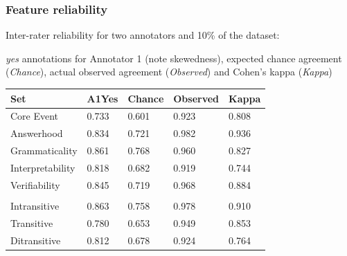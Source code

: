 \documentclass[handout,xcolor={dvipsnames}]{beamer}
\begin{document}
\begin{frame}
\frametitle{Feature reliability}
\pause
Inter-rater reliability for two annotators and 10\% of the dataset:
\pause

\textit{yes} annotations for Annotator 1 (note skewedness), expected chance agreement (\textit{Chance}), actual observed agreement (\textit{Observed}) and Cohen's kappa (\textit{Kappa})

\begin{table}[htb!]
\begin{center}
\begin{tabular}{|l|l||l|l||l|}
\hline
Set	& A1Yes & Chance & Observed & Kappa \\
\hline
\hline
Core Event & 0.733 & 0.601 & 0.923 & 0.808 \\
\hline
Answerhood & 0.834 & 0.721 & 0.982 & 0.936 \\
\hline
Grammaticality & 0.861 & 0.768 & 0.960 & 0.827 \\
\hline
Interpretability & 0.818 & 0.682 & 0.919 & 0.744 \\
\hline
Verifiability & 0.845 & 0.719 & 0.968 & 0.884 \\
\hline
\pause \\
\hline
Intransitive & 0.863 & 0.758 & 0.978 & 0.910 \\
\hline
Transitive & 0.780 & 0.653 & 0.949 & 0.853 \\
\hline
Ditransitive & 0.812 & 0.678 & 0.924 & 0.764 \\ 
\hline
\end{tabular}
\end{center}
\end{table}
\end{frame}
\end{document}
